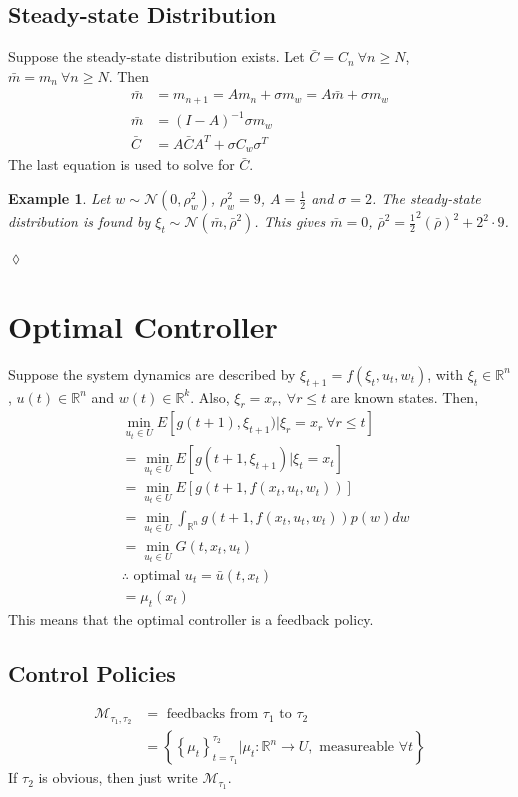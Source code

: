 \documentclass[lecture,12pt,]{pcms-l}
\theoremstyle{example}
\newtheorem{example}{Example}[section]
\begin{document}
\subsection{Steady-state Distribution}
Suppose the steady-state distribution exists. Let $\bar{C} = C_n ~\forall n\geq N$, $\bar{m} = m_n ~\forall n\geq N$. Then
\begin{align*}
\bar{m} &= m_{n+1} = Am_n + \sigma m_w = A\bar{m} + \sigma m_w \\
\bar{m} &= (I-A)^{-1}\sigma m_w \\
\bar{C} &= A\bar{C}A^T + \sigma C_w\sigma^T
\end{align*}
The last equation is used to solve for $\bar{C}$.

\begin{example}
Let $w\sim\mathcal{N}(0,\rho_w^2)$, $\rho_w^2=9$, $A=\frac{1}{2}$ and $\sigma=2$. The steady-state distribution is found by $\xi_t \sim\mathcal{N}(\bar{m}, \bar{\rho}^2)$. This gives $\bar{m}=0$, $\bar{\rho}^2 = \frac{1}{2}^2(\bar{\rho})^2 + 2^2\cdot 9$.
\end{example}
$\lozenge$

\section{Optimal Controller}
Suppose the system dynamics are described by $\xi_{t+1} = f(\xi_t,u_t,w_t)$, with $\xi_t\in\mathbb{R}^n$, $u(t)\in\mathbb{R}^n$ and $w(t)\in\mathbb{R}^k$. Also, $\xi_r=x_r, ~\forall r\leq t$ are known states. Then,
\begin{align*}
&\min_{u_t\in U} E[g(t+1),\xi_{t+1}) | \xi_r=x_r ~\forall r\leq t] \\
&= \min_{u_t\in U} E[g(t+1,\xi_{t+1}) | \xi_t=x_t] \\
&= \min_{u_t\in U} E[g(t+1, f(x_t,u_t,w_t))] \\
&= \min_{u_t\in U} \int_{\mathbb{R}^n} g(t+1,f(x_t,u_t,w_t))p(w)dw \\
&= \min_{u_t\in U} G(t,x_t,u_t) \\
&\therefore \text{ optimal } u_t=\bar{u}(t,x_t) \\
&= \mu_t(x_t)
\end{align*}
This means that the optimal controller is a feedback policy.

\subsection{Control Policies}
\begin{align*}
\mathcal{M}_{\tau_1,\tau_2} &= \text{ feedbacks from } \tau_1 \text{ to } \tau_2 \\
&= \left\lbrace\left\lbrace\mu_t\right\rbrace_{t=\tau_1}^{\tau_2} | \mu_t: \mathbb{R}^n \to U, \text{ measureable } \forall t\right\rbrace
\end{align*}
If $\tau_2$ is obvious, then just write $\mathcal{M}_{\tau_1}$.
\end{document}
